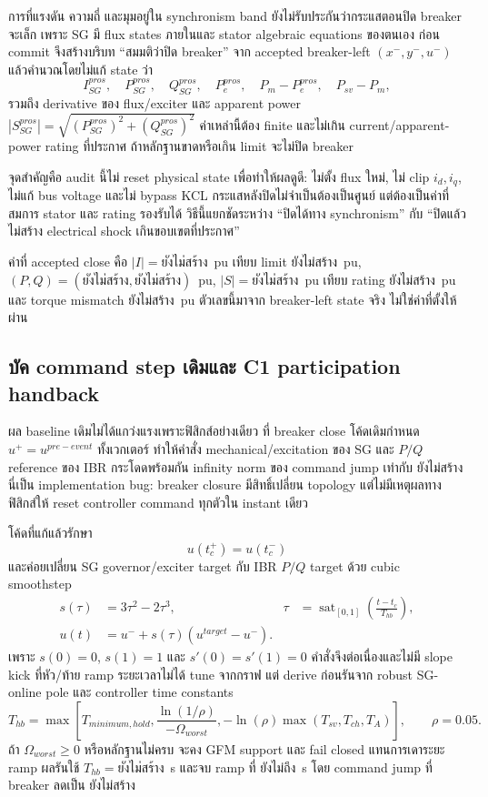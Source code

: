 \documentclass[12pt,a4paper]{article}
\newcommand{\RunHandbackDuration}{ยังไม่สร้าง}
\newcommand{\RunHandbackComplete}{ยังไม่ถึง}
\newcommand{\RunProsI}{ยังไม่สร้าง}
\newcommand{\RunProsP}{ยังไม่สร้าง}
\newcommand{\RunProsQ}{ยังไม่สร้าง}
\newcommand{\RunProsS}{ยังไม่สร้าง}
\newcommand{\RunProsTorque}{ยังไม่สร้าง}
\newcommand{\RunProsImax}{ยังไม่สร้าง}
\newcommand{\RunProsSmax}{ยังไม่สร้าง}
\newcommand{\CmpBaselineDU}{ยังไม่สร้าง}
\newcommand{\CmpImprovedDU}{ยังไม่สร้าง}
\begin{document}
การที่แรงดัน ความถี่ และมุมอยู่ใน synchronism band ยังไม่รับประกันว่ากระแสตอนปิด breaker จะเล็ก
เพราะ SG มี flux states ภายในและ stator algebraic equations ของตนเอง ก่อน commit จึงสร้างบริบท
``สมมติว่าปิด breaker'' จาก accepted breaker-left $(x^-,y^-,u^-)$ แล้วคำนวณโดยไม่แก้ state ว่า
\begin{equation}
I_{SG}^{pros},\quad P_{SG}^{pros},\quad Q_{SG}^{pros},\quad P_e^{pros},\quad
P_m-P_e^{pros},\quad P_{sv}-P_m,
\end{equation}
รวมถึง derivative ของ flux/exciter และ apparent power
$|S_{SG}^{pros}|=\sqrt{(P_{SG}^{pros})^2+(Q_{SG}^{pros})^2}$ ค่าเหล่านี้ต้อง finite และไม่เกิน
current/apparent-power rating ที่ประกาศ ถ้าหลักฐานขาดหรือเกิน limit จะไม่ปิด breaker

จุดสำคัญคือ audit นี้ไม่ reset physical state เพื่อทำให้ผลดูดี: ไม่ตั้ง flux ใหม่, ไม่ clip $i_d,i_q$,
ไม่แก้ bus voltage และไม่ bypass KCL กระแสหลังปิดไม่จำเป็นต้องเป็นศูนย์ แต่ต้องเป็นค่าที่สมการ stator
และ rating รองรับได้ วิธีนี้แยกชัดระหว่าง ``ปิดได้ทาง synchronism'' กับ ``ปิดแล้วไม่สร้าง electrical shock
เกินขอบเขตที่ประกาศ''

ค่าที่ accepted close คือ $|I|=\RunProsI$~pu เทียบ limit \RunProsImax~pu,
$(P,Q)=(\RunProsP,\RunProsQ)$~pu, $|S|=\RunProsS$~pu เทียบ rating \RunProsSmax~pu และ
torque mismatch \RunProsTorque~pu ตัวเลขนี้มาจาก breaker-left state จริง ไม่ใช่ค่าที่ตั้งให้ผ่าน

\subsection{บัค command step เดิมและ C1 participation handback}

ผล baseline เดิมไม่ได้แกว่งแรงเพราะฟิสิกส์อย่างเดียว ที่ breaker close โค้ดเดิมกำหนด
$u^+=u^{pre-event}$ ทั้งเวกเตอร์ ทำให้คำสั่ง mechanical/excitation ของ SG และ $P/Q$ reference ของ IBR
กระโดดพร้อมกัน infinity norm ของ command jump เท่ากับ \CmpBaselineDU{} นี่เป็น implementation bug:
breaker closure มีสิทธิ์เปลี่ยน topology แต่ไม่มีเหตุผลทางฟิสิกส์ให้ reset controller command ทุกตัวใน instant เดียว

โค้ดที่แก้แล้วรักษา
\begin{equation}
u(t_c^+)=u(t_c^-)
\end{equation}
และค่อยเปลี่ยน SG governor/exciter target กับ IBR $P/Q$ target ด้วย cubic smoothstep
\begin{align}
s(\tau)&=3\tau^2-2\tau^3, &
\tau&=\operatorname{sat}_{[0,1]}\left(\frac{t-t_c}{T_{hb}}\right),\\
u(t)&=u^-+s(\tau)(u^{target}-u^-).
\end{align}
เพราะ $s(0)=0$, $s(1)=1$ และ $s'(0)=s'(1)=0$ คำสั่งจึงต่อเนื่องและไม่มี slope kick ที่หัว/ท้าย ramp
ระยะเวลาไม่ได้ tune จากกราฟ แต่ derive ก่อนรันจาก robust SG-online pole และ controller time constants
\begin{equation}
T_{hb}=\max\left[
T_{minimum,hold},\frac{\ln(1/\rho)}{-\Omega_{worst}},
-\ln(\rho)\max(T_{sv},T_{ch},T_A)\right],\qquad \rho=0.05.
\end{equation}
ถ้า $\Omega_{worst}\ge0$ หรือหลักฐานไม่ครบ จะคง GFM support และ fail closed แทนการเดาระยะ ramp
ผลรันใช้ $T_{hb}=\RunHandbackDuration$~s และจบ ramp ที่ \RunHandbackComplete~s โดย command jump
ที่ breaker ลดเป็น \CmpImprovedDU
\end{document}
